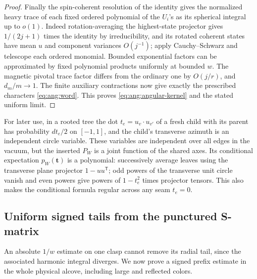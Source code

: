 \begin{proof}
Finally the spin-coherent resolution of the identity gives the normalized heavy trace of each fixed ordered polynomial of the \(U_i\)'s as its spherical integral up to \(o(1)\). Indeed rotation-averaging the highest-state projector gives \(1/(2j+1)\) times the identity by irreducibility, and its rotated coherent states have mean \(u\) and component variances \(O(j^{-1})\); apply Cauchy--Schwarz and telescope each ordered monomial. Bounded exponential factors can be approximated by fixed polynomial products uniformly at bounded \(w\). The magnetic pivotal trace factor differs from the ordinary one by \(O(j/r)\), and \(d_m/m\to1\). The finite auxiliary contractions now give exactly the prescribed characters \eqref{eq:ang:word}. This proves \eqref{eq:ang:angular-kernel} and the stated uniform limit.
\end{proof}

For later use, in a rooted tree the dot \(t_e=u_v\cdot u_{v'}\) of a fresh child with its parent has probability \(dt_e/2\) on \([-1,1]\), and the child's transverse azimuth is an independent circle variable. These variables are independent over all edges in the vacuum, but the inserted \(P_W\) is a joint function of the shared axes. Its conditional expectation \(p_W(\mathbf t)\) is a polynomial: successively average leaves using the transverse plane projector \(1-uu^{\mathsf T}\); odd powers of the transverse unit circle vanish and even powers give powers of \(1-t_e^2\) times projector tensors. This also makes the conditional formula regular across any seam \(t_e=0\).

\subsection{Uniform signed tails from the punctured S-matrix}

An absolute \(1/w\) estimate on one clasp cannot remove its radial tail, since the associated harmonic integral diverges. We now prove a signed prefix estimate in the whole physical alcove, including large and reflected colors.

